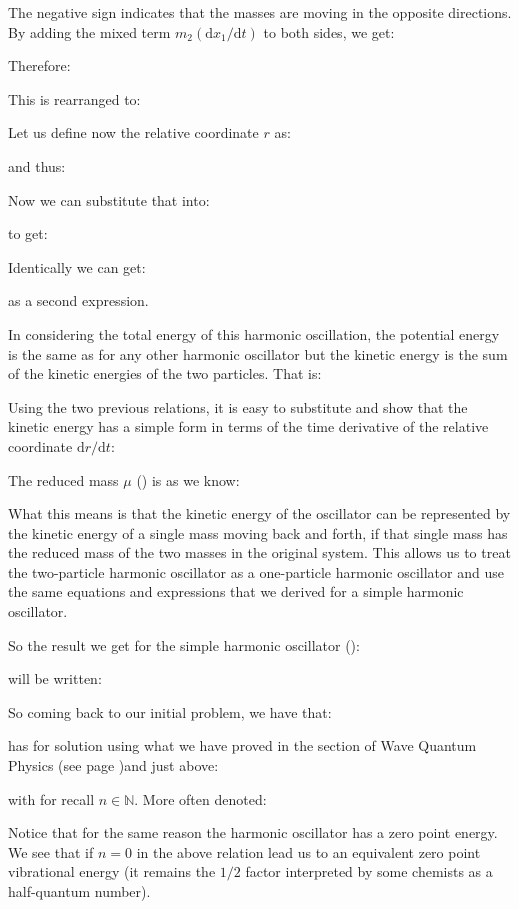 	The negative sign indicates that the masses are moving in the opposite directions. By adding the mixed term $m_2(\mathrm{d}x_1/\mathrm{d}t)$ to both sides, we get:
	
	Therefore:
	
	This is rearranged to:
	
	Let us define now the relative coordinate $r$ as:
	
	and thus:
	
	Now we can substitute that into:
	
	to get:
	
	Identically we can get:
	
	as a second expression.
	
	In considering the total energy of this harmonic oscillation, the potential energy 	is the same as for any other harmonic oscillator but the kinetic energy is the sum of 	the kinetic energies of the two particles. That is:
	
	Using the two previous relations, it is easy to substitute and show that the kinetic energy has a simple form in terms of the time derivative of the relative coordinate $\mathrm{d}r/\mathrm{d}t$:
	
	The reduced mass $\mu$ () is as we know:
	
	What this means is that the kinetic energy of the oscillator can be represented by the kinetic energy of a single mass moving back and forth, if that single mass has the reduced mass of the two masses in the original system. This allows us to treat the two-particle harmonic oscillator as a one-particle harmonic oscillator and use the same equations and expressions that we derived for a simple harmonic oscillator.
	
	So the result we get for the simple harmonic oscillator ():
	
	will be written:
	
	So coming back to our initial problem, we have that:
	
	has for solution using what we have proved in the section of Wave Quantum Physics (see page \pageref{quantum harmonic oscillator})and just above:
	
	with for recall $n\in \mathbb{N}$. More often denoted:
	
	Notice that for the same reason the harmonic oscillator has a zero point energy. We see that if $n=0$ in the above relation lead us to an equivalent zero point vibrational energy (it remains the $1/2$ factor interpreted by some chemists as a half-quantum number).
	
